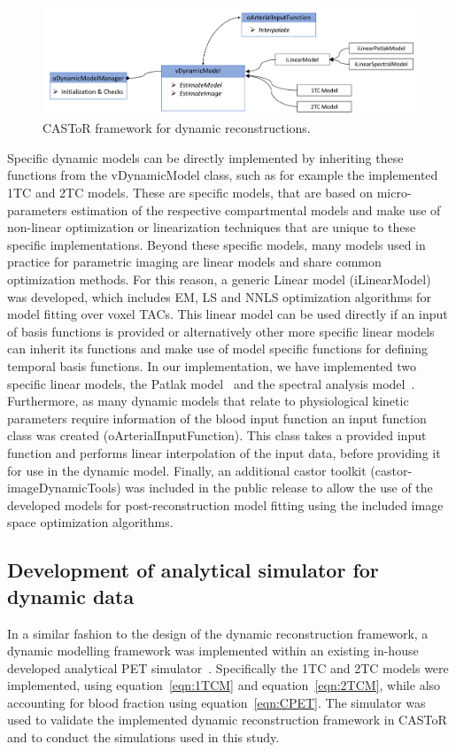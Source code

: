 \begin{figure} [htp!]
\centering
\includegraphics[scale=0.48,angle=0]{3_Results/3_2_Dynamic_Reconstruction_SimulationStudy/figures/oDynamicModelManager.pdf}
\caption{CASToR framework for dynamic reconstructions.} 
\label{fig3_2:DynamicModelManager}
\end{figure}

Specific dynamic models can be directly implemented by inheriting these functions from the vDynamicModel class, such as for example the implemented 1TC and 2TC models. These are specific models, that are based on micro-parameters estimation of the respective compartmental models and make use of non-linear optimization or linearization techniques that are unique to these specific implementations. 
Beyond these specific models, many models used in practice for parametric imaging are linear models and share common optimization methods. For this reason, a generic Linear model (iLinearModel) was developed, which includes EM, LS and NNLS optimization algorithms for model fitting over voxel TACs. This linear model can be used directly if an input of basis functions is provided or alternatively other more specific linear models can inherit its functions and make use of model specific functions for defining temporal basis functions.
In our implementation, we have implemented two specific linear models, the Patlak model~\cite{Patlak1985} and the spectral analysis model~\cite{Cunningham1993}. 
Furthermore, as many dynamic models that relate to physiological kinetic parameters require information of the blood input function an input function class was created (oArterialInputFunction). This class takes a provided input function and performs linear interpolation of the input data, before providing it for use in the dynamic model. 
Finally, an additional castor toolkit (castor-imageDynamicTools) was included in the public release to allow the use of the developed models for post-reconstruction model fitting using the included image space optimization algorithms. 

\subsection{Development of analytical simulator for dynamic data}
In a similar fashion to the design of the dynamic reconstruction framework, a dynamic modelling framework was implemented within an existing in-house developed analytical PET simulator~\cite{Stute2015}. Specifically the 1TC and 2TC models were implemented, using equation~\ref{eqn:1TCM} and equation~\ref{eqn:2TCM}, while also accounting for blood fraction using equation~\ref{eqn:CPET}.
The simulator was used to validate the implemented dynamic reconstruction framework in CASToR and to conduct the simulations used in this study.

